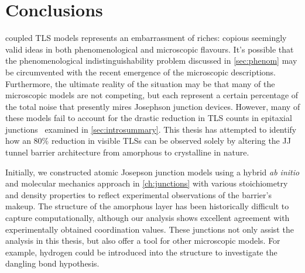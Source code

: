 \chapter{Conclusions}\label{ch:conclusions}

 coupled TLS models represents an embarrassment of riches: copious seemingly valid ideas in both phenomenological and microscopic flavours.
It's possible that the phenomenological indistinguishability problem discussed in \cref{sec:phenom} may be circumvented with the recent emergence of the microscopic descriptions.
Furthermore, the ultimate reality of the situation may be that many of the microscopic models are not competing, but each represent a certain percentage of the total noise that presently mires Josephson junction devices.
However, many of these models fail to account for the drastic reduction in TLS counts in epitaxial junctions~\cite{Oh2006} examined in \cref{sec:introsummary}.
This thesis has attempted to identify how an 80\% reduction in visible TLSs can be observed solely by altering the JJ tunnel barrier architecture from amorphous to crystalline in nature. 

Initially, we constructed atomic Josepson junction models using a hybrid \textit{ab initio} and molecular mechanics approach in \cref{ch:junctions} with various stoichiometry and density properties to reflect experimental observations of the barrier's makeup.
The structure of the amorphous layer has been historically difficult to capture computationally, although our analysis shows excellent agreement with experimentally obtained coordination values.
These junctions not only assist the analysis in this thesis, but also offer a tool for other microscopic models.
For example, hydrogen could be introduced into the structure to investigate the dangling bond hypothesis.

